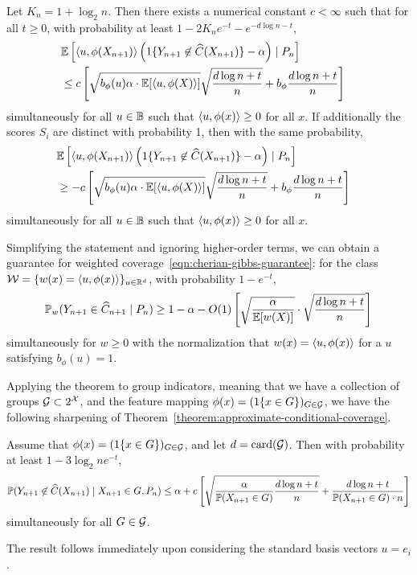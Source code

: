 \documentclass{article}
\newcommand{\radphi}{b_{\phi}}
\newcommand{\scorerv}{S}
\begin{document}
\begin{theorem}
  \label{theorem:one-sided-sharp}
  Let $K_n = 1 + \log_2 n$.
  Then there exists a numerical constant $c < \infty$ such that
  for all $t \ge 0$,
  with probability at least $1 - 2 K_n e^{-t} - e^{-d \log n - t}$,
  \begin{align*}
    \lefteqn{\E\left[\<u, \phi(X_{n+1})\>
      \left(\indics{Y_{n + 1} \not \in \what{C}(X_{n+1})}
      - \alpha\right)
      \mid P_n \right]} \\
    & \le c \left[\sqrt{\radphi(u) \alpha \cdot \E[\<u, \phi(X)\>]}
      \sqrt{\frac{d \log n + t}{n}}
      + \radphi \frac{d \log n + t}{n}\right]
  \end{align*}
  simultaneously for all $u \in \mathbb{B}$ such that
  $\langle u, \phi(x)\rangle \ge 0$ for all $x$.
  If additionally the scores $\scorerv_i$ are distinct
  with probability 1, then with the same probability,
  \begin{align*}
    \lefteqn{\E\left[\<u, \phi(X_{n+1})\>
      \left(\indics{Y_{n + 1} \not \in \what{C}(X_{n+1})}
      - \alpha\right)
      \mid P_n \right]} \\
    & \ge - c \left[\sqrt{\radphi(u) \alpha \cdot \E[\<u, \phi(X)\>]}
      \sqrt{\frac{d \log n + t}{n}}
      + \radphi \frac{d \log n + t}{n}\right]
  \end{align*}
  simultaneously for all $u \in \mathbb{B}$ such that
  $\langle u, \phi(x)\rangle \ge 0$ for all $x$.
\end{theorem}
\noindent
Simplifying the statement and ignoring higher-order terms, we can obtain a
guarantee for weighted coverage~\eqref{eqn:cherian-gibbs-guarantee}: for the
class $\mathcal{W} = \{w(x) = \langle u, \phi(x)\rangle\}_{u \in \mathbb{R}^d}$, with probability $1
- e^{-t}$,
\begin{equation*}
  \mathbb{P}_w(Y_{n + 1} \in \widehat{C}_{n + 1} \mid P_n)
  \ge 1 - \alpha - O(1) \left[\sqrt{\frac{\alpha}{\mathbb{E}[w(X)]}}
    \cdot \sqrt{\frac{d \log n + t}{n}}\right]
\end{equation*}
simultaneously for $w \ge 0$
with the normalization that $w(x) = \langle u, \phi(x)\rangle$ for
a $u$ satisfying $\radphi(u) = 1$.

Applying the theorem to group indicators, meaning that we have a collection
of groups $\mathcal{G} \subset 2^{\mathcal{X}}$, and the feature mapping $\phi(x) =
(1\!\left\{x \in G\right\})_{G \in \mathcal{G}}$, we have the following sharpening
of Theorem~\ref{theorem:approximate-conditional-coverage}.
\begin{corollary}
  Assume that $\phi(x) = (1\!\left\{x \in G\right\})_{G \in \mathcal{G}}$,
  and let $d = \mathop{\rm card}(\mathcal{G})$.
  Then with probability at least
  $1 - 3 \log_2 n e^{-t}$,
  \begin{equation*}
    \mathbb{P}(Y_{n + 1} \not \in \widehat{C}(X_{n + 1}) \mid X_{n + 1} \in G,
    P_n)
    \le \alpha +
    c \left[\sqrt{\frac{\alpha}{\mathbb{P}(X_{n + 1} \in G)}
        \frac{d \log n + t}{n}} +
      \frac{d \log n + t}{\mathbb{P}(X_{n + 1} \in G) \cdot n} \right]
  \end{equation*}
  simultaneously for all $G \in \mathcal{G}$.
\end{corollary}
\noindent
The result follows immediately upon considering the standard basis
vectors $u = e_i$.
%
\end{document}
